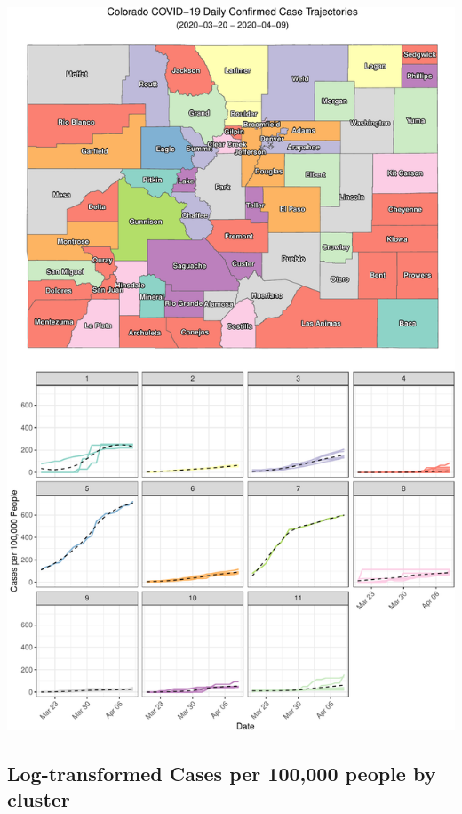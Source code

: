 \documentclass[]{article}
\begin{document}
\includegraphics{figs/county-clusters-smooth-raw-1.pdf}

\hypertarget{log-transformed-cases-per-100000-people-by-cluster}{%
\subsection{Log-transformed Cases per 100,000 people by
cluster}\label{log-transformed-cases-per-100000-people-by-cluster}}
\end{document}
